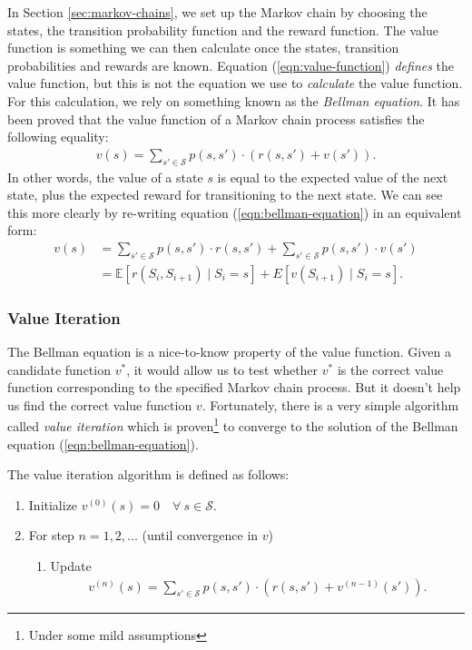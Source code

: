 \documentclass{article}
\begin{document}
      In Section \ref{sec:markov-chains}, we set up the Markov chain by choosing the states, the transition probability function and the reward function. The value function is something we can then calculate once the states, transition probabilities and rewards are known. Equation (\ref{eqn:value-function}) {\it defines} the value function, but this is not the equation we use to {\it calculate} the value function. For this calculation, we rely on something known as the {\it Bellman equation}. It has been proved that the value function of a Markov chain process satisfies the following equality:
      \begin{align}
        \label{eqn:bellman-equation}
        v(s) = \sum_{s' \in \mathcal S} p(s, s') \cdot (r(s, s') + v(s')).
      \end{align}
      In other words, the value of a state $s$ is equal to the expected value of the next state, plus the expected reward for transitioning to the next state. We can see this more clearly by re-writing equation (\ref{eqn:bellman-equation}) in an equivalent form:
      \begin{align*}
        v(s) &= \sum_{s' \in \mathcal S} p(s, s') \cdot r(s, s') + \sum_{s' \in \mathcal S} p(s, s') \cdot v(s')\\
        &= \mathbb E[r(S_i, S_{i+1}) \mid S_i = s] + E[v(S_{i+1}) \mid S_i = s].
      \end{align*}

    \subsubsection{\sc Value Iteration}

      The Bellman equation is a nice-to-know property of the value function. Given a candidate function $v^*$, it would allow us to test whether $v^*$ is the correct value function corresponding to the specified Markov chain process. But it doesn't help us find the correct value function $v$. Fortunately, there is a very simple algorithm called {\it value iteration} which is proven\footnote{Under some mild assumptions} to converge to the solution of the Bellman equation (\ref{eqn:bellman-equation}).

      The value iteration algorithm is defined as follows:
      \begin{enumerate}
        \item Initialize $v^{(0)}(s) = 0 \quad \forall~s\in\mathcal S$.
        \item For step $n = 1, 2, ...$ (until convergence in $v$)
        \begin{enumerate}
          \item Update
            \begin{align*}
              v^{(n)}(s) = \sum_{s' \in \mathcal S} p(s, s') \cdot (r(s, s') + v^{(n-1)}(s')).
            \end{align*}
        \end{enumerate}
      \end{enumerate}
\end{document}
